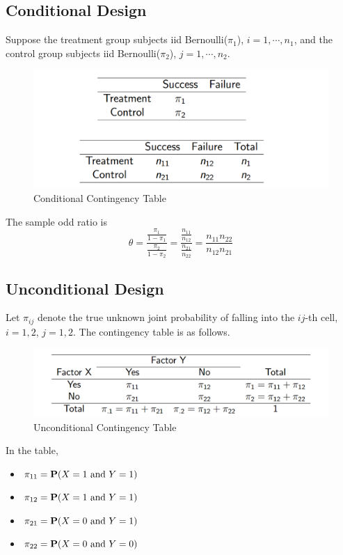 \subsection{Conditional Design}
Suppose the treatment group subjects iid Bernoulli($\pi_1$), $i = 1, \cdots, n_1$, and the control group subjects iid Bernoulli($\pi_2$), $j = 1, \cdots, n_2$.
\begin{figure}[H]
	\centering
	\includegraphics[width=0.7\linewidth]{fig/screenshot001}
	\caption{Conditional Contingency Table}
	\label{fig:screenshot001}
\end{figure}

The sample odd ratio is 
\[\hat{\theta} = \frac{\frac{\pi_1}{1 - \pi_1}}{\frac{\pi_2}{1 - \pi_2}} = \frac{\frac{n_{11}}{n_{12}}}{\frac{n_{21}}{n_{22}}} = \frac{n_{11}n_{22}}{n_{12}n_{21}}\]

\subsection{Unconditional Design}
Let $\pi_{ij}$ denote the true unknown joint probability of falling into the $ij$-th cell, $i=1,2$, $j=1,2$. The contingency table is as follows.

\begin{figure}[H]
	\centering
	\includegraphics[width=0.7\linewidth]{fig/screenshot002}
	\caption{Unconditional Contingency Table}
	\label{fig:screenshot002}
\end{figure}

In the table, 
\begin{itemize}
	\item $\pi_{11} = \P(X = 1 \text{ and } Y = 1)$
	\item $\pi_{12} = \P(X = 1 \text{ and } Y = 1)$
	\item $\pi_{21} = \P(X = 0 \text{ and } Y = 1)$
	\item $\pi_{22} = \P(X = 0 \text{ and } Y = 0)$
\end{itemize}

